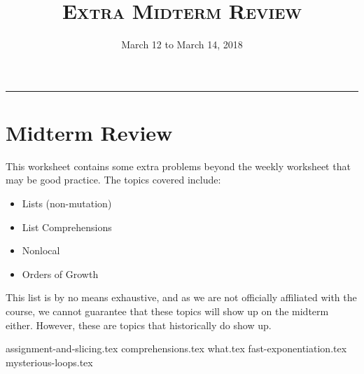 \documentclass{exam}
\title{\textsc{Extra Midterm Review}}
\date{March 12 to March 14, 2018}
\begin{document}
\maketitle
\rule{\textwidth}{0.15em}
\fontsize{12}{15}\selectfont

\section{Midterm Review}
This worksheet contains some extra problems beyond the weekly worksheet that may be good practice. The topics covered include:

\begin{itemize}
\item Lists (non-mutation)
\item List Comprehensions
\item Nonlocal
\item Orders of Growth
\end{itemize}

This list is by no means exhaustive, and as we are not officially affiliated with the course, we cannot guarantee that these topics will show up on the midterm either. However, these are topics that historically do show up.
\newpage
\begin{questions}
{assignment-and-slicing.tex}
{comprehensions.tex}
\newpage
{what.tex}
\newpage
{fast-exponentiation.tex}
{mysterious-loops.tex}
\end{questions}
\end{document}
